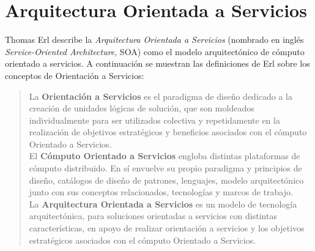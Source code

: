 \section{Arquitectura Orientada a Servicios}\label{sec:soa}
Thomas Erl describe la \textit{Arquitectura Orientada a Servicios} (nombrado en inglés \textit{Service-Oriented Architecture}, SOA) como el modelo arquitectónico de cómputo orientado a servicios\cite{SOAWithRest}. A continuación se muestran las definiciones de Erl\cite{SOAWithRest} sobre los conceptos de Orientación a Servicios:
\begin{quote}
La \textbf{Orientación a Servicios} es el paradigma de diseño dedicado a la creación de unidades lógicas de solución, que son moldeados individualmente para ser utilizados colectiva y repetidamente en la realización de objetivos estratégicos y beneficios asociados con el cómputo Orientado a Servicios.\\
El \textbf{Cómputo Orientado a Servicios} engloba distintas plataformas de cómputo distribuido. En sí envuelve su propio paradigma y principios de diseño, catálogos de diseño de patrones, lenguajes, modelo arquitectónico junto con sus conceptos relacionados, tecnologías y marcos de trabajo.\\
La \textbf{Arquitectura Orientada a Servicios} es un modelo de tecnología arquitectónica, para soluciones orientadas a servicios con distintas características, en apoyo de realizar orientación a servicios y los objetivos estratégicos asociados con el cómputo Orientado a Servicios.
\end{quote}
